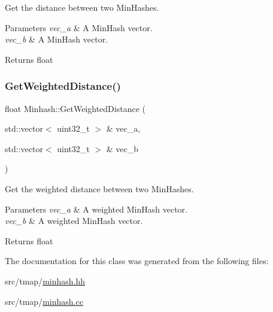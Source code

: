 Get the distance between two Min\+Hashes. 


\begin{DoxyParams}{Parameters}
{\em vec\+\_\+a} & A Min\+Hash vector. \\
\hline
{\em vec\+\_\+b} & A Min\+Hash vector. \\
\hline
\end{DoxyParams}
\begin{DoxyReturn}{Returns}
float 
\end{DoxyReturn}
\mbox{\label{classMinhash_a8b2bd50a845fb4aa513464de10ed3e21}} 
\subsubsection{\texorpdfstring{Get\+Weighted\+Distance()}{GetWeightedDistance()}}
{\footnotesize\ttfamily float Minhash\+::\+Get\+Weighted\+Distance (\begin{DoxyParamCaption}\item[{std\+::vector$<$ uint32\+\_\+t $>$ \&}]{vec\+\_\+a,  }\item[{std\+::vector$<$ uint32\+\_\+t $>$ \&}]{vec\+\_\+b }\end{DoxyParamCaption})}



Get the weighted distance between two Min\+Hashes. 


\begin{DoxyParams}{Parameters}
{\em vec\+\_\+a} & A weighted Min\+Hash vector. \\
\hline
{\em vec\+\_\+b} & A weighted Min\+Hash vector. \\
\hline
\end{DoxyParams}
\begin{DoxyReturn}{Returns}
float 
\end{DoxyReturn}


The documentation for this class was generated from the following files\+:\begin{DoxyCompactItemize}
\item 
src/tmap/\hyperlink{minhash_8hh}{minhash.\+hh}\item 
src/tmap/\hyperlink{minhash_8cc}{minhash.\+cc}\end{DoxyCompactItemize}
